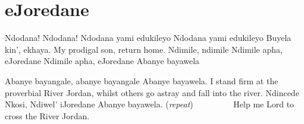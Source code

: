 \starttocol
\chapter{eJoredane}
\nexttocol
\hfill{\it }
\stoptocol
\starttocol
\startlines
N{\sc dodana}! Ndodana!
Ndodana yami edukileyo
Ndodana yami edukileyo
Buyela kin', ekhaya.
\stoplines
\nexttocol
My prodigal son, return home.
\stoptocol
\starttocol
\startlines
Ndimile, ndimile
Ndimile apha, eJoredane
Ndimile apha, eJoredane
Abanye bayawela                                           

Abanye bayangale, abanye bayangale
Abanye bayawela. 
\stoplines
\nexttocol
I stand firm at the proverbial River Jordan, 
whilst others go astray and fall into the river.
\stoptocol
\starttocol
\startlines
Ndincede Nkosi, Ndiwel' iJoredane
Abanye bayawela. \hfill({\it repeat})~~~~~~~~~
\stoplines
\nexttocol
Help me Lord to cross the River Jordan.
\stoptocol
